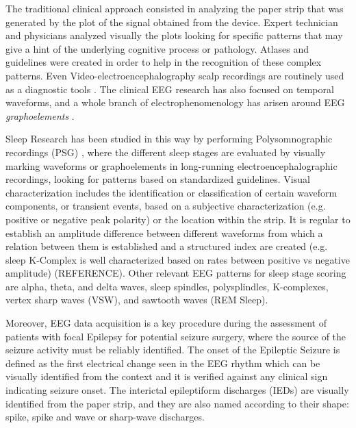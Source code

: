 \documentclass[sensors,article,submit,moreauthors,pdftex,10pt,a4paper]{mdpi}
\begin{document}
The traditional clinical approach consisted in analyzing the paper strip that was generated by the plot of the signal obtained from the device.  Expert technician and physicians analyzed visually the plots looking for specific patterns that may give a hint of the underlying cognitive process or pathology.   Atlases and guidelines were created in order to help in the recognition of these complex patterns.   Even Video-electroencephalography scalp recordings are routinely used as a diagnostic tools \citep{Giagante2003} .  The clinical EEG research has also focused on temporal waveforms, and a whole branch of electrophenomenology has arisen around EEG \textit{graphoelements} \citep{Schomer2010}.  

Sleep Research has been studied in this way by performing Polysomnographic recordings (PSG)  \citep{Rodenbeck2006}, where the different sleep stages are evaluated by visually marking waveforms or graphoelements in long-running electroencephalographic recordings, looking for patterns based on standardized guidelines.   Visual characterization includes the identification or classification of certain waveform components, or transient events, based on a subjective characterization (e.g. positive or negative peak polarity) or the location within the strip.  It is regular to establish an amplitude difference between different waveforms from which a relation between them is established and a structured index are created (e.g. sleep K-Complex is well characterized based on rates between positive vs negative amplitude) (REFERENCE).  Other relevant EEG patterns for sleep stage scoring are alpha, theta, and delta waves,  sleep spindles, polysplindles, K-complexes, vertex sharp waves (VSW), and sawtooth waves (REM Sleep).

Moreover, EEG data acquisition is a key procedure during the assessment of patients with focal Epilepsy for potential seizure surgery, where the source of the seizure activity must be reliably identified. The onset of the Epileptic Seizure is defined as the first electrical change seen in the EEG rhythm which can be visually identified from the context and it is verified against any clinical sign indicating seizure onset.  The interictal epileptiform discharges (IEDs) are visually identified from the paper strip, and they are also named according to their shape: spike, spike and wave or sharp-wave discharges\citep{EEGIntro}.  
\end{document}

